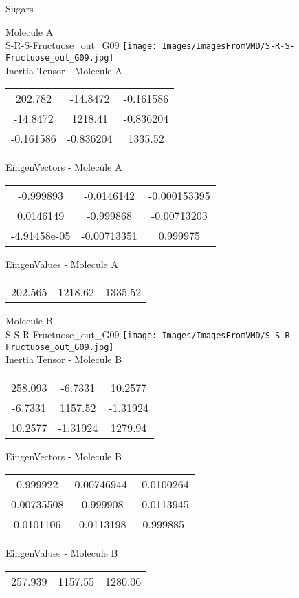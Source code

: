 \vtab[-2cm]
\begin{center}
{\large Sugars}
\end{center}
\begin{multicols}{2}
\begin{center}
Molecule A \\ 
S-R-S-Fructuose\_out\_G09
\texttt{[image: Images/ImagesFromVMD/S-R-S-Fructuose\_out\_G09.jpg]}
\\
Inertia Tensor - Molecule A \\
\vtab
\begin{tabular}{|c c c|}
202.782	 & 	-14.8472	 & 	-0.161586	 \\
-14.8472	 & 	1218.41	 & 	-0.836204	 \\
-0.161586	 & 	-0.836204	 & 	1335.52
\end{tabular}

\vtab
 EingenVectors - Molecule A     \\
\vtab
\begin{tabular}{|c c c|}
-0.999893	 & 	-0.0146142	 & 	-0.000153395	 \\
0.0146149	 & 	-0.999868	 & 	-0.00713203	 \\
-4.91458e-05	 & 	-0.00713351	 & 	0.999975
\end{tabular}

\vtab
 EingenValues - Molecule A     \\
\vtab
\begin{tabular}{|c c c|}
202.565	 & 	1218.62	 & 	1335.52
\end{tabular}
\columnbreak

Molecule B \\ 
S-S-R-Fructuose\_out\_G09
\texttt{[image: Images/ImagesFromVMD/S-S-R-Fructuose\_out\_G09.jpg]}
\\
Inertia Tensor - Molecule B \\
\vtab
\begin{tabular}{|c c c|}
258.093	 & 	-6.7331	 & 	10.2577	 \\
-6.7331	 & 	1157.52	 & 	-1.31924	 \\
10.2577	 & 	-1.31924	 & 	1279.94
\end{tabular}

\vtab
 EingenVectors - Molecule B     \\
\vtab
\begin{tabular}{|c c c|}
0.999922	 & 	0.00746944	 & 	-0.0100264	 \\
0.00735508	 & 	-0.999908	 & 	-0.0113945	 \\
0.0101106	 & 	-0.0113198	 & 	0.999885
\end{tabular}

\vtab
 EingenValues - Molecule B     \\
\vtab
\begin{tabular}{|c c c|}
257.939	 & 	1157.55	 & 	1280.06
\end{tabular}

\end{center}
\end{multicols}
